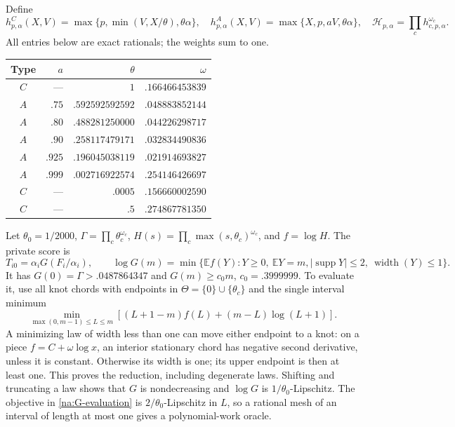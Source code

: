 Define
\[
 h^{C}_{p,\alpha}(X,V)=\max\{p,\min(V,X/\theta),\theta\alpha\},\quad
 h^{A}_{p,\alpha}(X,V)=\max\{X,p,aV,\theta\alpha\},\quad
 \mathcal H_{p,\alpha}=\prod_c h_{c,p,\alpha}^{\omega_c}.
\]
All entries below are exact rationals; the weights sum to one.
\begin{center}
\begin{tabular}{crrr}
\toprule Type & $a$ & $\theta$ & $\omega$\\\midrule
$C$ & --- & $1$ & $.166466453839$\\
$A$ & $.75$ & $.592592592592$ & $.048883852144$\\
$A$ & $.80$ & $.488281250000$ & $.044226298717$\\
$A$ & $.90$ & $.258117479171$ & $.032834490836$\\
$A$ & $.925$ & $.196045038119$ & $.021914693827$\\
$A$ & $.999$ & $.002716922574$ & $.254146426697$\\
$C$ & --- & $.0005$ & $.156660002590$\\
$C$ & --- & $.5$ & $.274867781350$\\\bottomrule
\end{tabular}
\end{center}
Let $\theta_0=1/2000$, $\Gamma=\prod_c\theta_c^{\omega_c}$,
$H(s)=\prod_c\max(s,\theta_c)^{\omega_c}$, and $f=\log H$. The private score is
\begin{equation}\label{na:private}
 T_{i0}=\alpha_iG(F_i/\alpha_i),\qquad
 \log G(m)=\min\{\mathbb Ef(Y):Y\ge0,\ \mathbb EY=m,
                  |\operatorname{supp}Y|\le2,\ \operatorname{width}(Y)\le1\}.
\end{equation}
It has $G(0)=\Gamma>.0487864347$ and $G(m)\ge c_0m$, $c_0=.3999999$.
To evaluate it, use all knot chords with endpoints in
$\Theta=\{0\}\cup\{\theta_c\}$ and the single interval minimum
\begin{equation}\label{na:G-evaluation}
 \min_{\max(0,m-1)\le L\le m}
 [(L+1-m)f(L)+(m-L)\log(L+1)].
\end{equation}
A minimizing law of width less than one can move either endpoint to a
knot: on a piece $f=C+\omega\log x$, an interior stationary chord has
negative second derivative, unless it is constant. Otherwise its width
is one; its upper endpoint is then at least one. This proves the reduction,
including degenerate laws. Shifting and truncating a law shows that $G$
is nondecreasing and $\log G$ is $1/\theta_0$-Lipschitz. The objective in
\eqref{na:G-evaluation} is $2/\theta_0$-Lipschitz in $L$, so a rational
mesh of an interval of length at most one gives a polynomial-work oracle.


